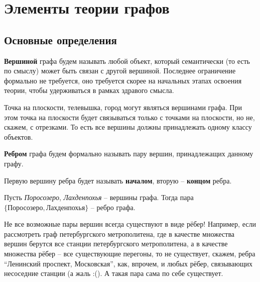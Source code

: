 \section{Элементы теории графов}
\subsection{Основные определения}
\begin{definition}
	\textbf{Вершиной} графа будем называть любой объект, который семантически (то есть по смыслу) может быть связан с другой вершиной. Последнее ограничение формально не требуется, оно требуется скорее на начальных этапах освоения теории, чтобы удерживаться в рамках здравого смысла.
\end{definition}
\begin{example}
	Точка на плоскости, телевышка, город могут являться вершинами графа. При этом точка на плоскости будет связываться только с точками на плоскости, но не, скажем, с отрезками. То есть все вершины должны принадлежать одному классу объектов.
\end{example}

\begin{definition}
	\textbf{Ребром} графа будем формально называть пару вершин, принадлежащих данному графу.
\end{definition}
\begin{definition}
	Первую вершину ребра будет называть \textbf{началом}, вторую -- \textbf{концом} ребра.
\end{definition}
\begin{example}
	Пусть \textit{Поросозеро}, \textit{Лахденпохья} -- вершины графа. Тогда пара $\{\textit{Поросозеро}, \textit{Лахденпохья}\}$ -- ребро графа.
\end{example}
\begin{remark} \label{metro}
	Не все возможные пары вершин всегда существуют в виде рёбер! Например, если рассмотреть граф петербургского метрополитена, где в качестве множества вершин берутся все станции петербургского метрополитена, а в качестве множества рёбер -- все существующие перегоны, то не существует, скажем, ребра ``{Ленинский проспект, Московская}'', как, впрочем, и любых рёбер, связывающих несоседние станции (а жаль :(). А такая пара сама по себе существует.
\end{remark}

